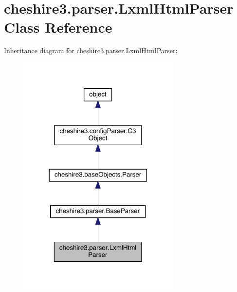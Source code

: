 \hypertarget{classcheshire3_1_1parser_1_1_lxml_html_parser}{\section{cheshire3.\-parser.\-Lxml\-Html\-Parser Class Reference}
\label{classcheshire3_1_1parser_1_1_lxml_html_parser}
}


Inheritance diagram for cheshire3.\-parser.\-Lxml\-Html\-Parser\-:
\nopagebreak
\begin{figure}[H]
\begin{center}
\leavevmode
\includegraphics[width=230pt]{classcheshire3_1_1parser_1_1_lxml_html_parser__inherit__graph}
\end{center}
\end{figure}


